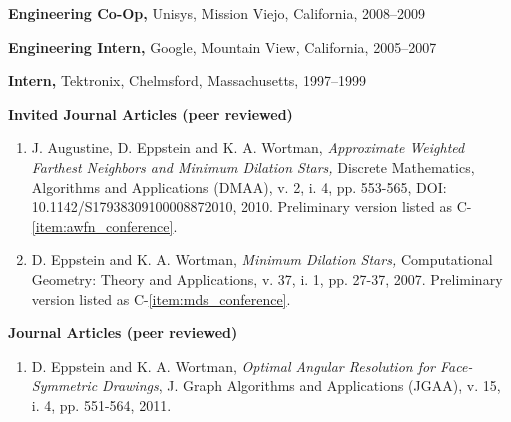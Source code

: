 \documentclass[11pt]{letter}
\begin{document}
\textbf{Engineering Co-Op,} Unisys, Mission Viejo, California, 2008--2009 %

\textbf{Engineering Intern,} Google, Mountain View, California, 2005--2007 %

\textbf{Intern,} Tektronix, Chelmsford, Massachusetts, 1997--1999 %

\clearpage
{}

\renewcommand{\labelenumi}{I-\arabic{enumi}.}
\textbf{Invited Journal Articles (peer reviewed)}
\begin{enumerate}
\item \label{item:awfn_journal} J. Augustine, D. Eppstein and K. A. Wortman, \emph{Approximate Weighted Farthest Neighbors and Minimum Dilation Stars,} Discrete Mathematics, Algorithms and Applications (DMAA), v. 2, i. 4, pp. 553-565, DOI: 10.1142/S17938309100008872010, 2010.  Preliminary version listed as C-\ref{item:awfn_conference}.
\item \label{item:mds_journal} D. Eppstein and K. A. Wortman, \emph{Minimum Dilation Stars,} Computational Geometry: Theory and Applications, v. 37, i. 1, pp. 27-37, 2007.  Preliminary version listed as C-\ref{item:mds_conference}.
\end{enumerate}

\renewcommand{\labelenumi}{J-\arabic{enumi}.}
\textbf{Journal Articles (peer reviewed)}
\begin{enumerate}
\item \label{item:oarpdsf_journal} D. Eppstein and K. A. Wortman, \emph{Optimal Angular Resolution for Face-Symmetric Drawings}, J. Graph Algorithms and Applications (JGAA), v. 15, i. 4, pp. 551-564, 2011.
\end{enumerate}
\end{document}
